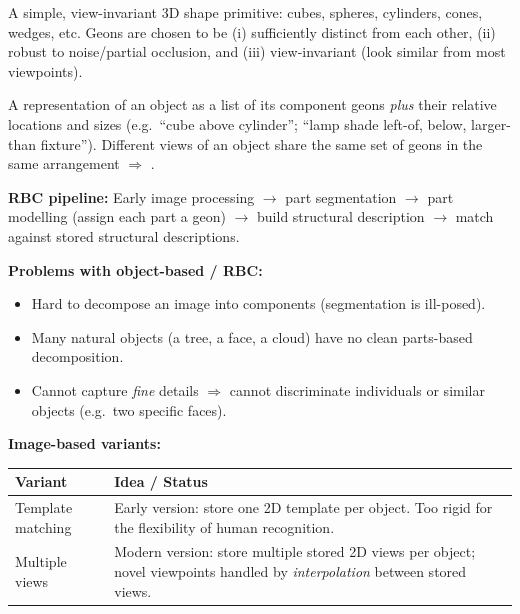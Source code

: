 \begin{defbox}[Geon]
A simple, view-invariant 3D shape primitive: cubes, spheres, cylinders, cones, wedges, etc. Geons are chosen to be (i) sufficiently distinct from each other, (ii) robust to noise/partial occlusion, and (iii) view-invariant (look similar from most viewpoints).
\end{defbox}

\begin{defbox}
A representation of an object as a list of its component geons \emph{plus} their relative locations and sizes (e.g.\ ``cube above cylinder''; ``lamp shade left-of, below, larger-than fixture''). Different views of an object share the same set of geons in the same arrangement $\Rightarrow$ .
\end{defbox}

\textbf{RBC pipeline:} Early image processing $\rightarrow$ part segmentation $\rightarrow$ part modelling (assign each part a geon) $\rightarrow$ build structural description $\rightarrow$ match against stored structural descriptions.

\textbf{Problems with object-based / RBC:}
\begin{itemize}
  \item Hard to decompose an image into components (segmentation is ill-posed).
  \item Many natural objects (a tree, a face, a cloud) have no clean parts-based decomposition.
  \item Cannot capture \emph{fine} details $\Rightarrow$ cannot discriminate individuals or similar objects (e.g.\ two specific faces).
\end{itemize}

\separator

\textbf{Image-based variants:}

\begin{center}
\renewcommand{\arraystretch}{1.3}
\begin{tabular}{@{} l p{8.5cm} @{}}
\toprule
\textbf{Variant} & \textbf{Idea / Status} \\
\midrule
Template matching & Early version: store one 2D template per object. Too rigid for the flexibility of human recognition. \\
Multiple views & Modern version: store multiple stored 2D views per object; novel viewpoints handled by \emph{interpolation} between stored views. \\
\bottomrule
\end{tabular}
\end{center}

